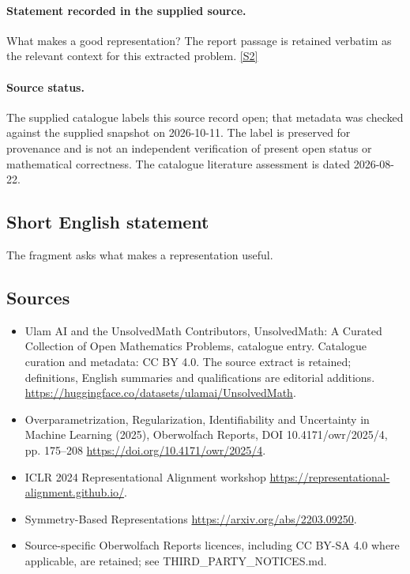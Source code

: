 \documentclass[11pt]{article}
\begin{document}
\paragraph{Statement recorded in the supplied source.}
What makes a good representation? The report passage is retained verbatim as the relevant context for this extracted problem. \href{https://doi.org/10.4171/owr/2025/4}{[S2]}
\paragraph{Source status.}
The supplied catalogue labels this source record open; that metadata was checked against the supplied snapshot on 2026-10-11. The label is preserved for provenance and is not an independent verification of present open status or mathematical correctness. The catalogue literature assessment is dated 2026-08-22.
\subsection{Short English statement}
The fragment asks what makes a representation useful.
\subsection{Sources}
\begin{itemize}
\item[S1] Ulam AI and the UnsolvedMath Contributors, UnsolvedMath: A Curated Collection of Open Mathematics Problems, catalogue entry. Catalogue curation and metadata: CC BY 4.0. The source extract is retained; definitions, English summaries and qualifications are editorial additions.
\url{https://huggingface.co/datasets/ulamai/UnsolvedMath}.
\item[S2] Overparametrization, Regularization, Identifiability and Uncertainty in Machine Learning (2025), Oberwolfach Reports, DOI 10.4171/owr/2025/4, pp. 175--208
\url{https://doi.org/10.4171/owr/2025/4}.
\item[S3] ICLR 2024 Representational Alignment workshop
\url{https://representational-alignment.github.io/}.
\item[S4] Symmetry-Based Representations
\url{https://arxiv.org/abs/2203.09250}.
\item Source-specific Oberwolfach Reports licences, including CC BY-SA 4.0 where applicable, are retained; see THIRD\_PARTY\_NOTICES.md.
\end{itemize}
\end{document}
